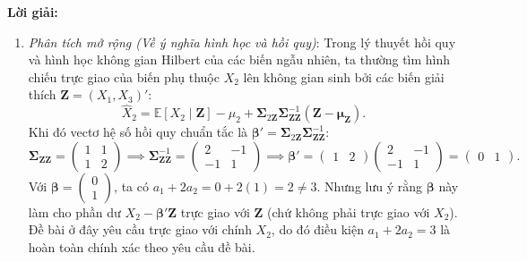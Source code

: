 \documentclass[11pt,a4paper]{article}
\newenvironment{solution}{%
  \par\noindent\textbf{Lời giải:}\ \ignorespaces
}{\par}
\theoremstyle{definition}
\begin{document}
\begin{solution}
\begin{enumerate}[label=\textbf{\alph*)}]
  \item \textit{Phân tích mở rộng (Về ý nghĩa hình học và hồi quy)}:
  Trong lý thuyết hồi quy và hình học không gian Hilbert của các biến ngẫu nhiên, ta thường tìm hình chiếu trực giao của biến phụ thuộc $X_2$ lên không gian sinh bởi các biến giải thích $\mathbf{Z} = (X_1, X_3)'$:
  \[
  \hat{X}_2 = \mathbb{E}[X_2 \mid \mathbf{Z}] - \mu_2 + \boldsymbol{\Sigma}_{2\mathbf{Z}} \boldsymbol{\Sigma}_{\mathbf{Z}\mathbf{Z}}^{-1} (\mathbf{Z} - \boldsymbol{\mu}_{\mathbf{Z}}).
  \]
  Khi đó vectơ hệ số hồi quy chuẩn tắc là $\boldsymbol{\beta}' = \boldsymbol{\Sigma}_{2\mathbf{Z}}\boldsymbol{\Sigma}_{\mathbf{Z}\mathbf{Z}}^{-1}$:
  \[
  \boldsymbol{\Sigma}_{\mathbf{Z}\mathbf{Z}} = \begin{pmatrix} 1 & 1 \\ 1 & 2 \end{pmatrix} \implies \boldsymbol{\Sigma}_{\mathbf{Z}\mathbf{Z}}^{-1} = \begin{pmatrix} 2 & -1 \\ -1 & 1 \end{pmatrix} \implies \boldsymbol{\beta}' = \begin{pmatrix} 1 & 2 \end{pmatrix} \begin{pmatrix} 2 & -1 \\ -1 & 1 \end{pmatrix} = \begin{pmatrix} 0 & 1 \end{pmatrix}.
  \]
  Với $\boldsymbol{\beta} = \begin{pmatrix} 0 \\ 1 \end{pmatrix}$, ta có $a_1 + 2a_2 = 0 + 2(1) = 2 \neq 3$. Nhưng lưu ý rằng $\boldsymbol{\beta}$ này làm cho phần dư $X_2 - \boldsymbol{\beta}'\mathbf{Z}$ trực giao với $\mathbf{Z}$ (chứ không phải trực giao với $X_2$). Đề bài ở đây yêu cầu trực giao với chính $X_2$, do đó điều kiện $a_1 + 2a_2 = 3$ là hoàn toàn chính xác theo yêu cầu đề bài.
\end{enumerate}
\end{solution}
\end{document}
